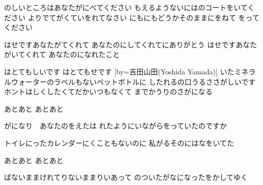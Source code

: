 \documentclass{article}
\newenvironment{Japanese}{%
\CJKfamily{min}%
\CJKtilde
\CJKnospace}{}
\begin{document}
\begin{CJK}{UTF8}{}
\begin{Japanese}
\begin{songs}{}
のしいところはあなたがにべてください
もえるようないにはのコートをいてください
よりでてがくていをれてなさい
にもにもどうかそのままにをねて
をってください

はせですあなたがてくれて
あなたのにしてくれてにありがとう
はせですあなたがいてくれて
あなたのになれたこと

はとてもしいです
はとてもせです
\endverse
\endsong
[by=吉田山田(Yoshida Yamada)]
\beginverse
{}いたミネラルウォーターのラベルもないペットボトルに
したれるの口うるささがしいです
ホントはしくしたくてだかいつもなくて
までかうりのさがになる

あとあと
あとあと

がになり　あなたのをえたは
れたようにいながらをっていたのですか

トイレにったカレンダーにくこともないのに
私がるそのにはなをいてた

あとあと
あとあと

ばないままけれてりないままりいあって
のついたがなになったをかしてゆく


\end{songs}
\end{Japanese}
\end{CJK}
\end{document}
